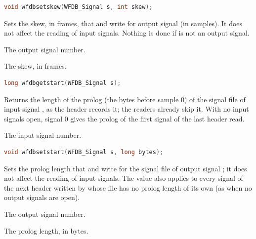 \begin{lstlisting}[language=C,style=signature]
void wfdbsetskew(WFDB_Signal s, int skew);
\end{lstlisting}
Sets the skew, in frames, that  and  write
for output signal  (in samples). It does not affect the reading of
input signals. Nothing is done if  is not an output signal.
\begin{params}
\item[s] The output signal number.
\item[skew] The skew, in frames.
\end{params}

\begin{lstlisting}[language=C,style=signature]
long wfdbgetstart(WFDB_Signal s);
\end{lstlisting}
Returns the length of the prolog (the bytes before sample 0) of the signal
file of input signal , as the header records it; the readers already
skip it. With no input signals open, signal 0 gives the prolog of the first
signal of the last header read.
\begin{params}
\item[s] The input signal number.
\end{params}

\begin{lstlisting}[language=C,style=signature]
void wfdbsetstart(WFDB_Signal s, long bytes);
\end{lstlisting}
Sets the prolog length that  and  write for
the signal file of output signal ; it does not affect the reading of
input signals. The value also applies to every signal of the next header
written by  whose file has no prolog length of its own (as
when no output signals are open).
\begin{params}
\item[s] The output signal number.
\item[bytes] The prolog length, in bytes.
\end{params}

